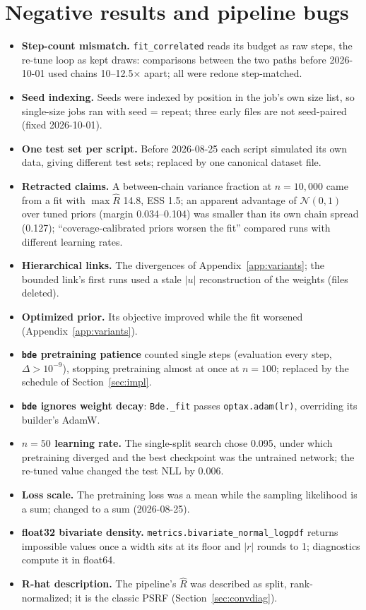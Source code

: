 \documentclass[11pt]{article}
\newcommand{\nzo}{\mathcal{N}(0,1)}
\newcommand{\code}[1]{\texttt{#1}}
\begin{document}
\section{Negative results and pipeline bugs}
\label{app:neg}
\begin{itemize}
\item \textbf{Step-count mismatch.} \code{fit\_correlated} reads its budget as raw steps, the re-tune loop as kept draws:
  comparisons between the two paths before 2026-10-01 used chains 10--12.5$\times$ apart; all were redone step-matched.
\item \textbf{Seed indexing.} Seeds were indexed by position in the job's own size list, so single-size jobs ran with
  seed = repeat; three early files are not seed-paired (fixed 2026-10-01).
\item \textbf{One test set per script.} Before 2026-08-25 each script simulated its own data, giving different test sets;
  replaced by one canonical dataset file.
\item \textbf{Retracted claims.} A between-chain variance fraction at $n=10{,}000$ came from a fit with $\max\widehat R$ 14.8,
  ESS 1.5; an apparent advantage of $\nzo$ over tuned priors (margin 0.034--0.104) was smaller than its own chain spread
  (0.127); ``coverage-calibrated priors worsen the fit'' compared runs with different learning rates.
\item \textbf{Hierarchical links.} The divergences of Appendix~\ref{app:variants}; the bounded link's first runs used a stale
  $|u|$ reconstruction of the weights (files deleted).
\item \textbf{Optimized prior.} Its objective improved while the fit worsened (Appendix~\ref{app:variants}).
\item \textbf{\code{bde} pretraining patience} counted single steps (evaluation every step, $\Delta>10^{-9}$), stopping pretraining
  almost at once at $n=100$; replaced by the schedule of Section~\ref{sec:impl}.
\item \textbf{\code{bde} ignores weight decay}: \code{Bde.\_fit} passes \code{optax.adam(lr)}, overriding its builder's AdamW.
\item \textbf{$n=50$ learning rate.} The single-split search chose 0.095, under which pretraining diverged and the best checkpoint
  was the untrained network; the re-tuned value changed the test NLL by 0.006.
\item \textbf{Loss scale.} The pretraining loss was a mean while the sampling likelihood is a sum; changed to a sum (2026-08-25).
\item \textbf{float32 bivariate density.} \code{metrics.bivariate\_normal\_logpdf} returns impossible values once a width sits at
  its floor and $|r|$ rounds to 1; diagnostics compute it in float64.
\item \textbf{R-hat description.} The pipeline's $\widehat R$ was described as split, rank-normalized; it is the classic PSRF
  (Section~\ref{sec:convdiag}).
\end{itemize}
\end{document}
